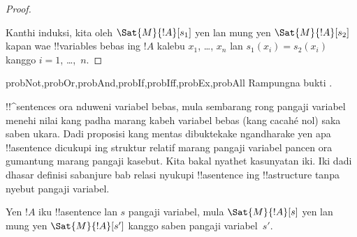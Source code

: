 \documentclass[../../../include/open-logic-section]{subfiles}
\begin{document}
\begin{proof}
\begin{enumerate}
\end{enumerate}
Kanthi induksi, kita oleh $\Sat{M}{!A}[s_1]$ yen lan mung yen
$\Sat{M}{!A}[s_2]$ kapan wae !!{variable}s bebas ing $!A$
kalebu $x_1$, \dots, $x_n$ lan $s_1(x_i)=s_2(x_i)$
kanggo $i = 1$, \dots,~$n$.
\end{proof}

\begin{probtag}{probNot,probOr,probAnd,probIf,probIff,probEx,probAll}
Rampungna bukti .
\end{probtag}

\begin{explain}
!!^{sentence}s ora nduweni variabel bebas, mula sembarang
rong pangaji variabel menehi nilai kang padha marang kabeh
variabel bebas (kang cacahé nol) saka saben ukara. Dadi
proposisi kang mentas dibuktekake ngandharake yen apa
!!a{sentence} dicukupi ing struktur relatif marang pangaji
variabel pancen ora gumantung marang pangaji kasebut.
Kita bakal nyathet kasunyatan iki. Iki dadi dhasar
definisi sabanjure bab relasi nyukupi !!a{sentence} ing
!!a{structure} tanpa nyebut pangaji variabel.
\end{explain}

\begin{cor}
Yen $!A$ iku !!a{sentence} lan $s$ pangaji variabel, mula
$\Sat{M}{!A}[s]$ yen lan mung yen $\Sat{M}{!A}[s']$
kanggo saben pangaji variabel~$s'$.
\end{cor}
\end{document}
